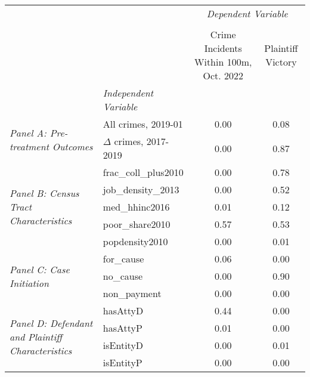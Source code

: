 \begin{tabular}{llcc}
\toprule
 &  & \multicolumn{2}{c}{\textit{Dependent Variable}} \\
\cline{3-4}
\\
 &  & Crime Incidents Within 100m, Oct. 2022 & Plaintiff Victory \\
 & \emph{Independent Variable} &  &  \\
\midrule
\multirow[c]{2}{3cm}{\textit{Panel A: Pre-treatment Outcomes}} & All crimes, 2019-01 & 0.00 & 0.08 \\
 & $\Delta$ crimes, 2017-2019 & 0.00 & 0.87 \\
\cline{1-4}
\multirow[c]{5}{3cm}{\textit{Panel B: Census Tract Characteristics}} & frac\_coll\_plus2010 & 0.00 & 0.78 \\
 & job\_density\_2013 & 0.00 & 0.52 \\
 & med\_hhinc2016 & 0.01 & 0.12 \\
 & poor\_share2010 & 0.57 & 0.53 \\
 & popdensity2010 & 0.00 & 0.01 \\
\cline{1-4}
\multirow[c]{3}{3cm}{\textit{Panel C: Case Initiation}} & for\_cause & 0.06 & 0.00 \\
 & no\_cause & 0.00 & 0.90 \\
 & non\_payment & 0.00 & 0.00 \\
\cline{1-4}
\multirow[c]{4}{3cm}{\textit{Panel D: Defendant and Plaintiff Characteristics}} & hasAttyD & 0.44 & 0.00 \\
 & hasAttyP & 0.01 & 0.00 \\
 & isEntityD & 0.00 & 0.01 \\
 & isEntityP & 0.00 & 0.00 \\
\cline{1-4}
\bottomrule
\end{tabular}
